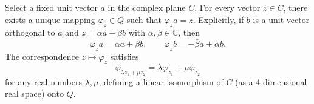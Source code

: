 Select a fixed unit vector $a$ in the complex plane $C$. For every vector $z \in C$, there exists a unique mapping $\varphi_z \in Q$ such that $\varphi_z a = z$. Explicitly, if $b$ is a unit vector orthogonal to $a$ and $z = \alpha a + \beta b$ with $\alpha, \beta \in \mathbb{C}$, then
$$
\varphi_z a = \alpha a + \beta b, \qquad
\varphi_z b = -\bar{\beta} a + \bar{\alpha} b.
$$
The correspondence $z \mapsto \varphi_z$ satisfies
$$
\varphi_{\lambda z_1 + \mu z_2} = \lambda \varphi_{z_1} + \mu \varphi_{z_2}
$$
for any real numbers $\lambda, \mu$, defining a linear isomorphism of $C$ (as a 4-dimensional real space) onto $Q$.
